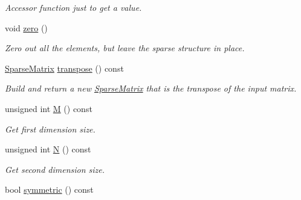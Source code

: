 \begin{DoxyCompactItemize}
\begin{DoxyCompactList}\small\item\em Accessor function just to get a value. \item\end{DoxyCompactList}\item 
\hypertarget{classSparseMatrix_a2c2fc091cf1427bd39a9a63a9d826946}{
void \hyperlink{classSparseMatrix_a2c2fc091cf1427bd39a9a63a9d826946}{zero} ()}
\label{classSparseMatrix_a2c2fc091cf1427bd39a9a63a9d826946}

\begin{DoxyCompactList}\small\item\em Zero out all the elements, but leave the sparse structure in place. \item\end{DoxyCompactList}\item 
\hypertarget{classSparseMatrix_a89bc12943de66e18417897d99171ae45}{
\hyperlink{classSparseMatrix}{SparseMatrix} \hyperlink{classSparseMatrix_a89bc12943de66e18417897d99171ae45}{transpose} () const }
\label{classSparseMatrix_a89bc12943de66e18417897d99171ae45}

\begin{DoxyCompactList}\small\item\em Build and return a new \hyperlink{classSparseMatrix}{SparseMatrix} that is the transpose of the input matrix. \item\end{DoxyCompactList}\item 
\hypertarget{classSparseMatrix_af7eaa8485815c74f35eeb2a09a8b7cef}{
unsigned int \hyperlink{classSparseMatrix_af7eaa8485815c74f35eeb2a09a8b7cef}{M} () const }
\label{classSparseMatrix_af7eaa8485815c74f35eeb2a09a8b7cef}

\begin{DoxyCompactList}\small\item\em Get first dimension size. \item\end{DoxyCompactList}\item 
\hypertarget{classSparseMatrix_a59d5df1dfb7197fa16a7b39c9c12a94e}{
unsigned int \hyperlink{classSparseMatrix_a59d5df1dfb7197fa16a7b39c9c12a94e}{N} () const }
\label{classSparseMatrix_a59d5df1dfb7197fa16a7b39c9c12a94e}

\begin{DoxyCompactList}\small\item\em Get second dimension size. \item\end{DoxyCompactList}\item 
\hypertarget{classSparseMatrix_a0354c00ce8434bdbd276a52f01b439b0}{
bool \hyperlink{classSparseMatrix_a0354c00ce8434bdbd276a52f01b439b0}{symmetric} () const }
\label{classSparseMatrix_a0354c00ce8434bdbd276a52f01b439b0}


\end{DoxyCompactItemize}
